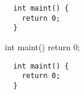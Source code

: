 \documentclass{article}
\begin{document}
\begin{verbatim}
  int maint() {
    return 0;
  }
\end{verbatim}

\begin{SomeVerbatimcode}
  int maint() {
    return 0;
  }
\end{SomeVerbatimcode}

\begin{verbatim}
  int maint() {
    return 0;
  }
\end{verbatim}
\end{document}
